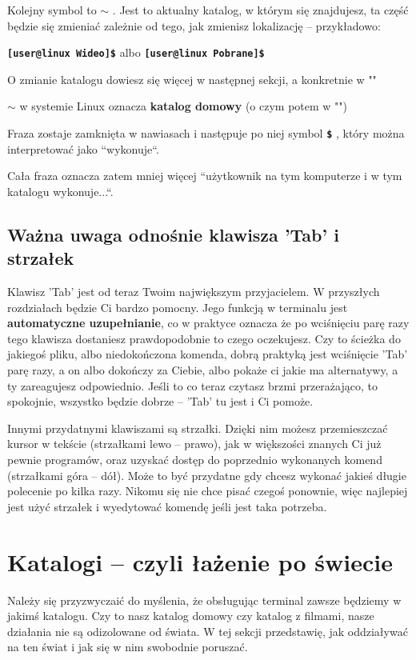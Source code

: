 \documentclass[12pt]{article}
\newcommand{\ttbf}[1]{
    \texttt{\textbf{#1}}
}
\begin{document}
Kolejny symbol to \ttbf{$\sim$}. Jest to aktualny katalog, w którym się znajdujesz, ta część będzie się zmieniać zależnie od tego, jak zmienisz lokalizację -- przykładowo:

\ttbf{[user@linux Wideo]\$} albo \ttbf{[user@linux Pobrane]\$}

O zmianie katalogu dowiesz się więcej w następnej sekcji, a konkretnie w ""

\ttbf{$\sim$} w systemie Linux oznacza \textbf{katalog domowy} (o czym potem w "")

Fraza zostaje zamknięta w nawiasach i następuje po niej symbol \ttbf{\$}, który można interpretować jako ``wykonuje``.

Cała fraza oznacza zatem mniej więcej ``użytkownik na tym komputerze i w tym katalogu wykonuje...``.

\subsection{Ważna uwaga odnośnie klawisza 'Tab' i strzałek}

Klawisz 'Tab' jest od teraz Twoim największym przyjacielem. W przyszłych rozdziałach będzie Ci bardzo pomocny. Jego funkcją w terminalu jest \textbf{automatyczne uzupełnianie}, co w praktyce oznacza że po wciśnięciu parę razy tego klawisza dostaniesz prawdopodobnie to czego oczekujesz. Czy to ścieżka do jakiegoś pliku, albo niedokończona komenda, dobrą praktyką jest wciśnięcie 'Tab' parę razy, a on albo dokończy za Ciebie, albo pokaże ci jakie ma alternatywy, a ty zareagujesz odpowiednio. Jeśli to co teraz czytasz brzmi przerażająco, to spokojnie, wszystko będzie dobrze -- 'Tab' tu jest i Ci pomoże.

Innymi przydatnymi klawiszami są strzałki. Dzięki nim możesz przemieszczać kursor w tekście (strzałkami lewo -- prawo), jak w większości znanych Ci już pewnie programów, oraz uzyskać dostęp do poprzednio wykonanych komend (strzałkami góra -- dół). Może to być przydatne gdy chcesz wykonać jakieś długie polecenie po kilka razy. Nikomu się nie chce pisać czegoś ponownie, więc najlepiej jest użyć strzałek i wyedytować komendę jeśli jest taka potrzeba.

\section{Katalogi -- czyli łażenie po świecie}

Należy się przyzwyczaić do myślenia, że obsługując terminal zawsze będziemy w jakimś katalogu. Czy to nasz katalog domowy czy katalog z filmami, nasze działania nie są odizolowane od świata. W tej sekcji przedstawię, jak oddziaływać na ten świat i jak się w nim swobodnie poruszać.
\end{document}
